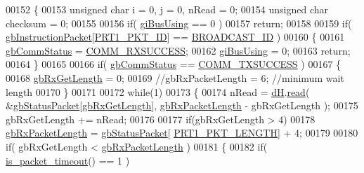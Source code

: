 \begin{DoxyCode}
00152 \{
00153     \textcolor{keywordtype}{unsigned} \textcolor{keywordtype}{char} i = 0, j = 0, nRead = 0;
00154     \textcolor{keywordtype}{unsigned} \textcolor{keywordtype}{char} checksum = 0;
00155 
00156     \textcolor{keywordflow}{if}( \hyperlink{classdynamixel_ad10e0e49f5fef04bf789a89c14cc470a}{giBusUsing} == 0 )
00157         \textcolor{keywordflow}{return};
00158 
00159     \textcolor{keywordflow}{if}( \hyperlink{classdynamixel_afd94dcf01b8e96298727776e222de722}{gbInstructionPacket}[\hyperlink{dynamixel_8h_a3c2bb339c587abadd977eb2f14daeff9}{PRT1\_PKT\_ID}] == 
      \hyperlink{dynamixel_8h_ab9fe47395310b34fa1ceb112c9ca10e2}{BROADCAST\_ID} )
00160     \{
00161         \hyperlink{classdynamixel_a5b603f6bed7ccc595f1f50bd6a6ebbfc}{gbCommStatus} = \hyperlink{dynamixel_8h_a171328d9f298535c18d079f65e631434}{COMM\_RXSUCCESS};
00162         \hyperlink{classdynamixel_ad10e0e49f5fef04bf789a89c14cc470a}{giBusUsing} = 0;
00163         \textcolor{keywordflow}{return};
00164     \}
00165     
00166     \textcolor{keywordflow}{if}( \hyperlink{classdynamixel_a5b603f6bed7ccc595f1f50bd6a6ebbfc}{gbCommStatus} == \hyperlink{dynamixel_8h_aac6d30f996256b24d311de81eb0f0c1e}{COMM\_TXSUCCESS} )
00167     \{
00168         \hyperlink{classdynamixel_a9d590ce24791d111c2db9b66be1e046d}{gbRxGetLength} = 0;
00169         \textcolor{comment}{//gbRxPacketLength = 6; //minimum wait length}
00170     \}
00171     
00172     \textcolor{keywordflow}{while}(1)
00173     \{
00174         nRead = \hyperlink{classdynamixel_ae003cc90ada6d7b70eaa4ea9d42d4deb}{dH}.\hyperlink{classdxl__hal_ac36331febb2eaa66303af3483795742a}{read}( &\hyperlink{classdynamixel_aa57c86d3bbbeaf5c9d4f6bd00376b04f}{gbStatusPacket}[\hyperlink{classdynamixel_a9d590ce24791d111c2db9b66be1e046d}{gbRxGetLength}], 
      \hyperlink{classdynamixel_a333686e1b5903d16c41df8172b6bd5a8}{gbRxPacketLength} - gbRxGetLength );
00175         gbRxGetLength += nRead;
00176 
00177         \textcolor{keywordflow}{if}(gbRxGetLength > 4)
00178             \hyperlink{classdynamixel_a333686e1b5903d16c41df8172b6bd5a8}{gbRxPacketLength} = \hyperlink{classdynamixel_aa57c86d3bbbeaf5c9d4f6bd00376b04f}{gbStatusPacket}[
      \hyperlink{dynamixel_8h_ab24601f91d0364e4b62edad3c2a0a5c4}{PRT1\_PKT\_LENGTH}] + 4;
00179 
00180         \textcolor{keywordflow}{if}( gbRxGetLength < \hyperlink{classdynamixel_a333686e1b5903d16c41df8172b6bd5a8}{gbRxPacketLength} )
00181         \{
00182             \textcolor{keywordflow}{if}( \hyperlink{classdynamixel_afddd976dbc486cd08b92e0e6e4117519}{is\_packet\_timeout}() == 1 )

\end{DoxyCode}
